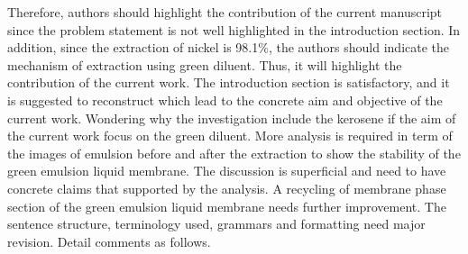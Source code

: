 \documentclass[11pt,answers]{exam}
\begin{document}
Therefore, authors should highlight the contribution of the current manuscript since the problem statement is not well highlighted in the introduction section. In addition, since the extraction of nickel is 98.1\%, the authors should indicate the mechanism of extraction using green diluent. Thus, it will highlight the contribution of the current work. The introduction section is satisfactory, and it is suggested to reconstruct which lead to the concrete aim and objective of the current work. Wondering why the investigation include the kerosene if the aim of the current work focus on the green diluent.  More analysis is required in term of the images of emulsion before and after the extraction to show the stability of the green emulsion liquid membrane. The discussion is superficial and need to have concrete claims that supported by the analysis. A recycling of membrane phase section of the green emulsion liquid membrane needs further improvement. The sentence structure, terminology used, grammars and formatting need major revision.  Detail comments as follows.
\end{document}
